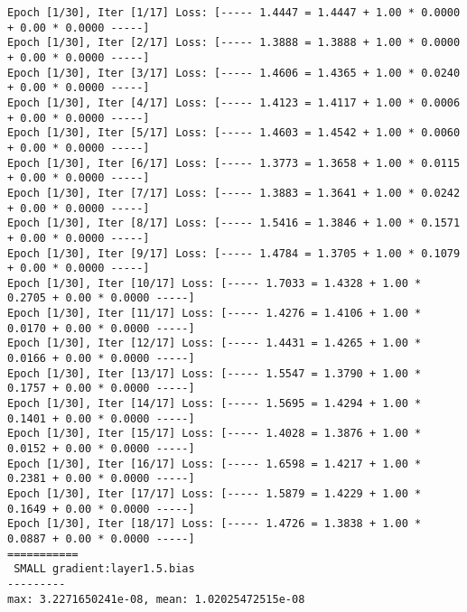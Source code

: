\documentclass[11pt]{article}
\begin{document}
    \begin{Verbatim}[commandchars=\\\{\}]
Epoch [1/30], Iter [1/17] Loss: [----- 1.4447 = 1.4447 + 1.00 * 0.0000 + 0.00 * 0.0000 -----]
Epoch [1/30], Iter [2/17] Loss: [----- 1.3888 = 1.3888 + 1.00 * 0.0000 + 0.00 * 0.0000 -----]
Epoch [1/30], Iter [3/17] Loss: [----- 1.4606 = 1.4365 + 1.00 * 0.0240 + 0.00 * 0.0000 -----]
Epoch [1/30], Iter [4/17] Loss: [----- 1.4123 = 1.4117 + 1.00 * 0.0006 + 0.00 * 0.0000 -----]
Epoch [1/30], Iter [5/17] Loss: [----- 1.4603 = 1.4542 + 1.00 * 0.0060 + 0.00 * 0.0000 -----]
Epoch [1/30], Iter [6/17] Loss: [----- 1.3773 = 1.3658 + 1.00 * 0.0115 + 0.00 * 0.0000 -----]
Epoch [1/30], Iter [7/17] Loss: [----- 1.3883 = 1.3641 + 1.00 * 0.0242 + 0.00 * 0.0000 -----]
Epoch [1/30], Iter [8/17] Loss: [----- 1.5416 = 1.3846 + 1.00 * 0.1571 + 0.00 * 0.0000 -----]
Epoch [1/30], Iter [9/17] Loss: [----- 1.4784 = 1.3705 + 1.00 * 0.1079 + 0.00 * 0.0000 -----]
Epoch [1/30], Iter [10/17] Loss: [----- 1.7033 = 1.4328 + 1.00 * 0.2705 + 0.00 * 0.0000 -----]
Epoch [1/30], Iter [11/17] Loss: [----- 1.4276 = 1.4106 + 1.00 * 0.0170 + 0.00 * 0.0000 -----]
Epoch [1/30], Iter [12/17] Loss: [----- 1.4431 = 1.4265 + 1.00 * 0.0166 + 0.00 * 0.0000 -----]
Epoch [1/30], Iter [13/17] Loss: [----- 1.5547 = 1.3790 + 1.00 * 0.1757 + 0.00 * 0.0000 -----]
Epoch [1/30], Iter [14/17] Loss: [----- 1.5695 = 1.4294 + 1.00 * 0.1401 + 0.00 * 0.0000 -----]
Epoch [1/30], Iter [15/17] Loss: [----- 1.4028 = 1.3876 + 1.00 * 0.0152 + 0.00 * 0.0000 -----]
Epoch [1/30], Iter [16/17] Loss: [----- 1.6598 = 1.4217 + 1.00 * 0.2381 + 0.00 * 0.0000 -----]
Epoch [1/30], Iter [17/17] Loss: [----- 1.5879 = 1.4229 + 1.00 * 0.1649 + 0.00 * 0.0000 -----]
Epoch [1/30], Iter [18/17] Loss: [----- 1.4726 = 1.3838 + 1.00 * 0.0887 + 0.00 * 0.0000 -----]
===========
 SMALL gradient:layer1.5.bias
---------
max: 3.2271650241e-08, mean: 1.02025472515e-08

    \end{Verbatim}

    \begin{center}
    \end{center}
    { \hspace*{\fill} \\}
    
    \begin{center}
    \end{center}
    { \hspace*{\fill} \\}
    
\end{document}
